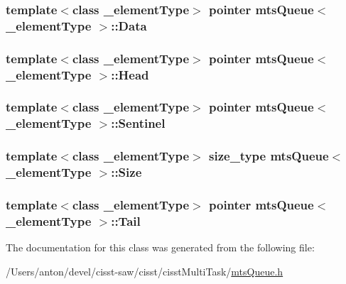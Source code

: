 \subsubsection[{Data}]{\setlength{\rightskip}{0pt plus 5cm}template$<$class \+\_\+element\+Type$>$ {\bf pointer} {\bf mts\+Queue}$<$ \+\_\+element\+Type $>$\+::Data\hspace{0.3cm}{\ttfamily [protected]}}\label{classmts_queue_a7967ce45474f4266531201ec0ff65480}
\hypertarget{classmts_queue_a9d7bee24b9b1e45e318dee474d66f12c}{}
\subsubsection[{Head}]{\setlength{\rightskip}{0pt plus 5cm}template$<$class \+\_\+element\+Type$>$ {\bf pointer} {\bf mts\+Queue}$<$ \+\_\+element\+Type $>$\+::Head\hspace{0.3cm}{\ttfamily [protected]}}\label{classmts_queue_a9d7bee24b9b1e45e318dee474d66f12c}
\hypertarget{classmts_queue_aa80fac3217d8148da5383e6fe9ac0fa4}{}
\subsubsection[{Sentinel}]{\setlength{\rightskip}{0pt plus 5cm}template$<$class \+\_\+element\+Type$>$ {\bf pointer} {\bf mts\+Queue}$<$ \+\_\+element\+Type $>$\+::Sentinel\hspace{0.3cm}{\ttfamily [protected]}}\label{classmts_queue_aa80fac3217d8148da5383e6fe9ac0fa4}
\hypertarget{classmts_queue_ac479b4223b71cdc7f9b49325e91ab6c6}{}
\subsubsection[{Size}]{\setlength{\rightskip}{0pt plus 5cm}template$<$class \+\_\+element\+Type$>$ {\bf size\+\_\+type} {\bf mts\+Queue}$<$ \+\_\+element\+Type $>$\+::Size\hspace{0.3cm}{\ttfamily [protected]}}\label{classmts_queue_ac479b4223b71cdc7f9b49325e91ab6c6}
\hypertarget{classmts_queue_a3fc27909e8863597f5cc79288f555a9d}{}
\subsubsection[{Tail}]{\setlength{\rightskip}{0pt plus 5cm}template$<$class \+\_\+element\+Type$>$ {\bf pointer} {\bf mts\+Queue}$<$ \+\_\+element\+Type $>$\+::Tail\hspace{0.3cm}{\ttfamily [protected]}}\label{classmts_queue_a3fc27909e8863597f5cc79288f555a9d}


The documentation for this class was generated from the following file\+:\begin{DoxyCompactItemize}
\item 
/\+Users/anton/devel/cisst-\/saw/cisst/cisst\+Multi\+Task/\hyperlink{mts_queue_8h}{mts\+Queue.\+h}\end{DoxyCompactItemize}
